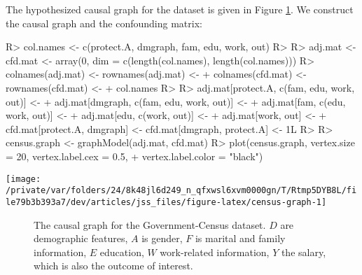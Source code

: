\documentclass[
  notitle]{jss}
\begin{document}
The hypothesized causal graph for the dataset is given in Figure
\ref{fig:censusgraph}. We construct the causal graph and the confounding
matrix:

\begin{CodeChunk}
\begin{CodeInput}
R> col.names <- c(protect.A, dmgraph, fam, edu, work, out)
R> 
R> adj.mat <- cfd.mat <- array(0, dim = c(length(col.names), length(col.names)))
R> colnames(adj.mat) <- rownames(adj.mat) <-
+   colnames(cfd.mat) <- rownames(cfd.mat) <-
+   col.names
R> 
R> adj.mat[protect.A, c(fam, edu, work, out)] <-
+   adj.mat[dmgraph, c(fam, edu, work, out)] <-
+   adj.mat[fam, c(edu, work, out)] <-
+   adj.mat[edu, c(work, out)] <-
+   adj.mat[work, out] <-
+   cfd.mat[protect.A, dmgraph] <- cfd.mat[dmgraph, protect.A] <- 1L
R> 
R> census.graph <- graphModel(adj.mat, cfd.mat)
R> plot(census.graph, vertex.size = 20, vertex.label.cex = 0.5,
+   vertex.label.color = "black")
\end{CodeInput}


\begin{center}\texttt{[image: /private/var/folders/24/8k48jl6d249\_n\_qfxwsl6xvm0000gn/T/Rtmp5DYB8L/file79b3b393a7/dev/articles/jss\_files/figure-latex/census-graph-1]} \end{center}

\end{CodeChunk}

\begin{figure} \centering
    \caption{The causal graph for the Government-Census dataset. $D$ are demographic features, $A$ is gender, $F$ is marital and family information, $E$ education, $W$ work-related information, $Y$ the salary, which is also the outcome of interest.}
    \label{fig:censusgraph}
\end{figure}
\end{document}
